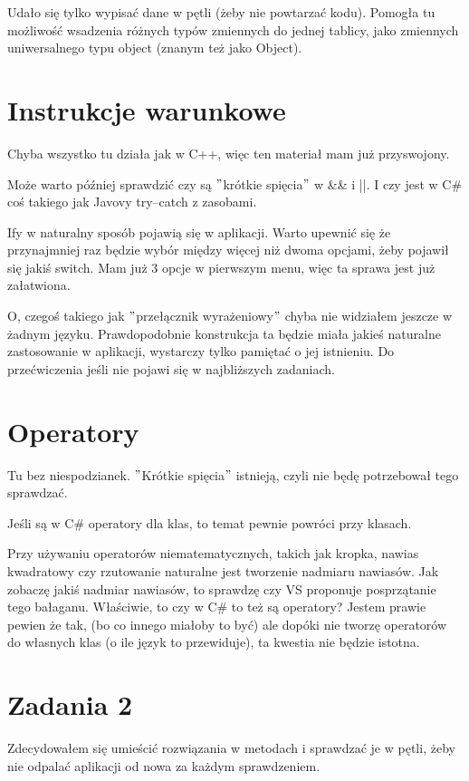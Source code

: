 \documentclass[10pt]{article}
\begin{document}
Udało się tylko wypisać dane w pętli (żeby nie powtarzać kodu). Pomogła tu możliwość wsadzenia różnych typów zmiennych do jednej tablicy, jako zmiennych uniwersalnego typu object (znanym też jako Object).

\section{Instrukcje warunkowe}
Chyba wszystko tu działa jak w C++, więc ten materiał mam już przyswojony.

Może warto później sprawdzić czy są $"$krótkie spięcia$"$ w \&\& i ||. I czy jest w C\# coś takiego jak Javovy try--catch z zasobami.

Ify w naturalny sposób pojawią się w aplikacji. Warto upewnić się że przynajmniej raz będzie wybór między więcej niż dwoma opcjami, żeby pojawił się jakiś switch. Mam już 3 opcje w pierwszym menu, więc ta sprawa jest już załatwiona.

O, czegoś takiego jak $"$przełącznik wyrażeniowy$"$ chyba nie widziałem jeszcze w żadnym języku. Prawdopodobnie konstrukcja ta będzie miała jakieś naturalne zastosowanie w aplikacji, wystarczy tylko pamiętać o jej istnieniu. Do przećwiczenia jeśli nie pojawi się w najbliższych zadaniach.

\section{Operatory}
Tu bez niespodzianek. $"$Krótkie spięcia$"$ istnieją, czyli nie będę potrzebował tego sprawdzać.

Jeśli są w C\# operatory dla klas, to temat pewnie powróci przy klasach.

Przy używaniu operatorów niematematycznych, takich jak kropka, nawias kwadratowy czy rzutowanie naturalne jest tworzenie nadmiaru nawiasów. Jak zobaczę jakiś nadmiar nawiasów, to sprawdzę czy VS proponuje posprzątanie tego bałaganu. Właściwie, to czy w C\# to też są operatory? Jestem prawie pewien że tak, (bo co innego miałoby to być) ale dopóki nie tworzę operatorów do własnych klas (o ile język to przewiduje), ta kwestia nie będzie istotna.

\section{Zadania 2}
Zdecydowałem się umieścić rozwiązania w metodach i sprawdzać je w pętli, żeby nie odpalać aplikacji od nowa za każdym sprawdzeniem.
\end{document}
